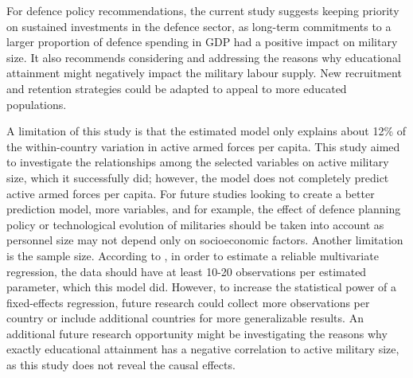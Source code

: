 For defence policy recommendations, the current study suggests keeping priority on sustained 
investments in the defence sector, as long-term commitments to a larger proportion of defence 
spending in GDP had a positive impact on military size. It also recommends considering and 
addressing the reasons why educational attainment might negatively impact the military labour supply. 
New recruitment and retention strategies could be adapted to appeal to more educated 
populations.

A limitation of this study is that the estimated model only explains about 12\% of the within-country 
variation in active armed forces per capita. 
This study aimed to investigate the relationships among the selected variables on 
active military size, which it successfully did; however, the model does not completely predict 
active armed forces per capita. For future studies looking to create a better prediction model, 
more variables, and for example, the effect of defence planning policy or technological evolution of militaries 
should be taken into account as 
personnel size may not depend only on socioeconomic factors.
Another limitation is the sample size. According to \textcite{harrell_multivariable_2015},
in order to estimate a reliable multivariate regression, the data should have at least 
10-20 observations per estimated parameter, which this model did. 
However, to increase the statistical 
power of a fixed-effects regression, 
future research could collect more observations per country or 
include additional countries for more generalizable results.
An additional future research opportunity might be investigating the reasons why exactly educational 
attainment has a negative correlation to active military size, as this study does not reveal 
the causal effects.

